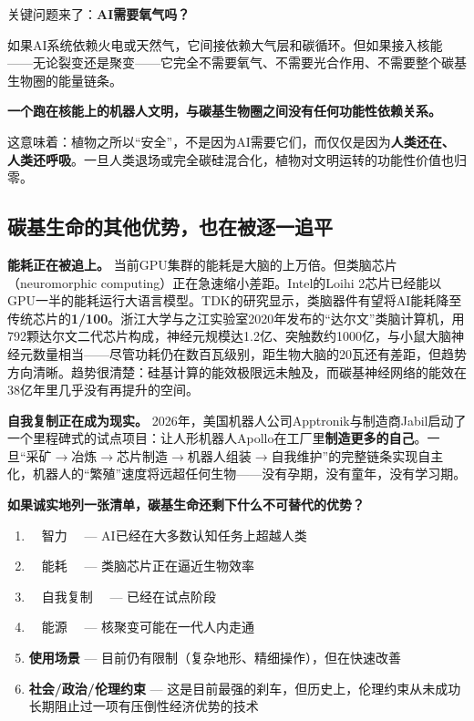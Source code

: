 \documentclass[11pt,a4paper]{ctexart}
\begin{document}
关键问题来了：\textbf{AI需要氧气吗？}

如果AI系统依赖火电或天然气，它间接依赖大气层和碳循环。但如果接入核能——无论裂变还是聚变——它完全不需要氧气、不需要光合作用、不需要整个碳基生物圈的能量链条。

\textbf{一个跑在核能上的机器人文明，与碳基生物圈之间没有任何功能性依赖关系。}

这意味着：植物之所以“安全”，不是因为AI需要它们，而仅仅是因为\textbf{人类还在、人类还呼吸}。一旦人类退场或完全碳硅混合化，植物对文明运转的功能性价值也归零。

\subsection{碳基生命的其他优势，也在被逐一追平}

\textbf{能耗正在被追上。} 当前GPU集群的能耗是大脑的上万倍。但类脑芯片（neuromorphic computing）正在急速缩小差距。Intel的Loihi 2芯片已经能以GPU一半的能耗运行大语言模型。TDK的研究显示，类脑器件有望将AI能耗降至传统芯片的\textbf{1/100}。浙江大学与之江实验室2020年发布的“达尔文”类脑计算机，用792颗达尔文二代芯片构成，神经元规模达1.2亿、突触数约1000亿，与小鼠大脑神经元数量相当——尽管功耗仍在数百瓦级别，距生物大脑的20瓦还有差距，但趋势方向清晰。趋势很清楚：硅基计算的能效极限远未触及，而碳基神经网络的能效在38亿年里几乎没有再提升的空间。

\textbf{自我复制正在成为现实。} 2026年，美国机器人公司Apptronik与制造商Jabil启动了一个里程碑式的试点项目：让人形机器人Apollo在工厂里\textbf{制造更多的自己}。一旦“采矿$\to$冶炼$\to$芯片制造$\to$机器人组装$\to$自我维护”的完整链条实现自主化，机器人的“繁殖”速度将远超任何生物——没有孕期，没有童年，没有学习期。

\textbf{如果诚实地列一张清单，碳基生命还剩下什么不可替代的优势？}

\begin{enumerate}
  \item ~~智力~~ — AI已经在大多数认知任务上超越人类
  \item ~~能耗~~ — 类脑芯片正在逼近生物效率
  \item ~~自我复制~~ — 已经在试点阶段
  \item ~~能源~~ — 核聚变可能在一代人内走通
  \item \textbf{使用场景} — 目前仍有限制（复杂地形、精细操作），但在快速改善
  \item \textbf{社会/政治/伦理约束} — 这是目前最强的刹车，但历史上，伦理约束从未成功长期阻止过一项有压倒性经济优势的技术
\end{enumerate}
\end{document}
